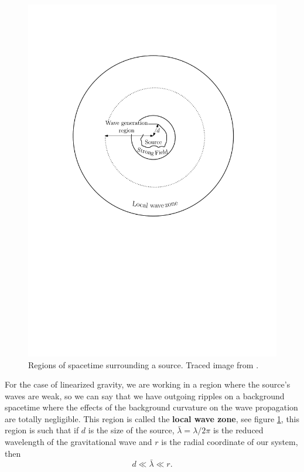 \begin{figure}[h]
\begin{centering}
\includegraphics[scale=0.65]{Kap3/radiacion.pdf}\caption{Regions of spacetime surrounding a source. Traced image from \cite{THORNE-EX}. \label{figure1}}
\par\end{centering}
\end{figure}

For the case of linearized gravity, we are working in a region where
the source's waves are weak, so we can say that we have outgoing ripples
on a background spacetime where the effects of the background curvature
on the wave propagation are totally negligible. This region is called
the \textbf{local wave zone}, see figure \ref{figure1}, this region
is such that if $d$ is the size of the source, $\bar{\lambda}=\lambda/2\pi$
is the reduced wavelength of the gravitational wave and $r$ is the
radial coordinate of our system, then 
\[
d\ll\bar{\lambda}\ll r.
\]

